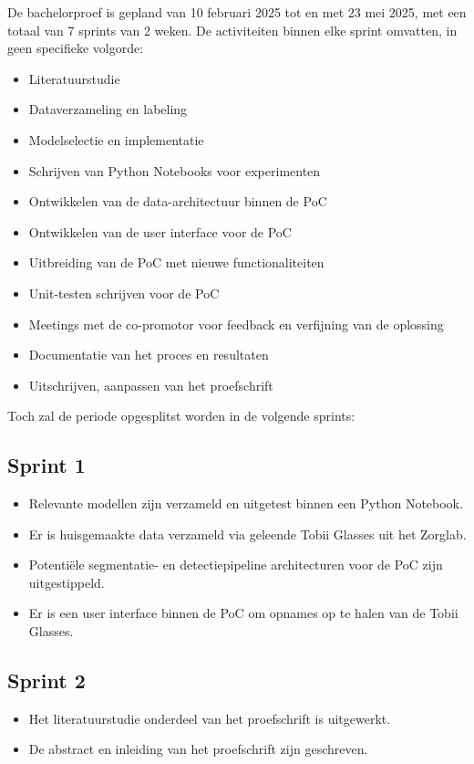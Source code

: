 De bachelorproef is gepland van 10 februari 2025 tot en met 23 mei 2025, met een totaal van 7 sprints van 2 weken.
De activiteiten binnen elke sprint omvatten, in geen specifieke volgorde:
\begin{itemize}
    \item Literatuurstudie
    \item Dataverzameling en labeling
    \item Modelselectie en implementatie
    \item Schrijven van Python Notebooks voor experimenten
    \item Ontwikkelen van de data-architectuur binnen de PoC
    \item Ontwikkelen van de user interface voor de PoC
    \item Uitbreiding van de PoC met nieuwe functionaliteiten
    \item Unit-testen schrijven voor de PoC
    \item Meetings met de co-promotor voor feedback en verfijning van de oplossing
    \item Documentatie van het proces en resultaten
    \item Uitschrijven, aanpassen van het proefschrift
\end{itemize}
Toch zal de periode opgesplitst worden in de volgende sprints:

\subsection{Sprint 1}
\begin{itemize}
    \item Relevante modellen zijn verzameld en uitgetest binnen een Python Notebook.
    \item Er is huisgemaakte data verzameld via geleende Tobii Glasses uit het Zorglab.
    \item Potentiële segmentatie- en detectiepipeline architecturen voor de PoC zijn uitgestippeld.
    \item Er is een user interface binnen de PoC om opnames op te halen van de Tobii Glasses.
\end{itemize}
\subsection{Sprint 2}
\begin{itemize}
    \item Het literatuurstudie onderdeel van het proefschrift is uitgewerkt.
    \item De abstract en inleiding van het proefschrift zijn geschreven.
\end{itemize}
